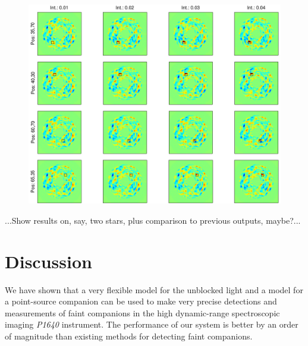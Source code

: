 \documentclass[12pt,pdftex,preprint]{aastex}
\newcommand{\project}[1]{\textsl{#1}}
\begin{document}
\begin{figure}[h!]
\begin{center}
\includegraphics[width=5in]{figs/maps.pdf}
\end{center}
\vspace{-7mm}
\caption{}
\label{fig:results1}
\end{figure}

...Show results on, say, two stars, plus comparison to previous
outputs, maybe?...

\section{Discussion}

We have shown that a very flexible model for the unblocked light and a
model for a point-source companion can be used to make very precise
detections and measurements of faint companions in the high
dynamic-range spectroscopic imaging \project{P1640} instrument.  The
performance of our system is better by an order of magnitude than
existing methods for detecting faint companions.
\end{document}
